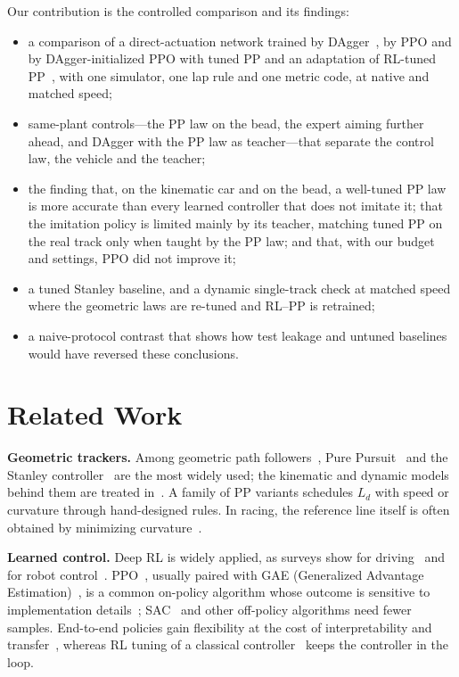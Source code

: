\documentclass{IJCAS}
\begin{document}
Our contribution is the controlled comparison and its findings:
\begin{itemize}\setlength{\itemsep}{1pt}\setlength{\parskip}{0pt}\setlength{\topsep}{2pt}
\item a comparison of a direct-actuation network trained by DAgger~\cite{ross2011}, by PPO and by DAgger-initialized PPO with tuned PP and an adaptation of RL-tuned PP~\cite{elgouhary2026}, with one simulator, one lap rule and one metric code, at native and matched speed;
\item same-plant controls---the PP law on the bead, the expert aiming further ahead, and DAgger with the PP law as teacher---that separate the control law, the vehicle and the teacher;
\item the finding that, on the kinematic car and on the bead, a well-tuned PP law is more accurate than every learned controller that does not imitate it; that the imitation policy is limited mainly by its teacher, matching tuned PP on the real track only when taught by the PP law; and that, with our budget and settings, PPO did not improve it;
\item a tuned Stanley baseline, and a dynamic single-track check at matched speed where the geometric laws are re-tuned and RL--PP is retrained;
\item a naive-protocol contrast that shows how test leakage and untuned baselines would have reversed these conclusions.
\end{itemize}

\section{Related Work}
\textbf{Geometric trackers.} Among geometric path followers~\cite{snider2009}, Pure Pursuit~\cite{coulter1992} and the Stanley controller~\cite{hoffmann2007} are the most widely used; the kinematic and dynamic models behind them are treated in~\cite{rajamani2012,kong2015}. A family of PP variants schedules $L_d$ with speed or curvature through hand-designed rules. In racing, the reference line itself is often obtained by minimizing curvature~\cite{heilmeier2020,betz2022}.

\textbf{Learned control.} Deep RL is widely applied, as surveys show for driving~\cite{kiran2022} and for robot control~\cite{kober2013}. PPO~\cite{schulman2017}, usually paired with GAE (Generalized Advantage Estimation)~\cite{schulman2016}, is a common on-policy algorithm whose outcome is sensitive to implementation details~\cite{andrychowicz2021}; SAC~\cite{haarnoja2018} and other off-policy algorithms need fewer samples. End-to-end policies gain flexibility at the cost of interpretability and transfer~\cite{evans2023}, whereas RL tuning of a classical controller~\cite{elgouhary2026} keeps the controller in the loop.
\end{document}
